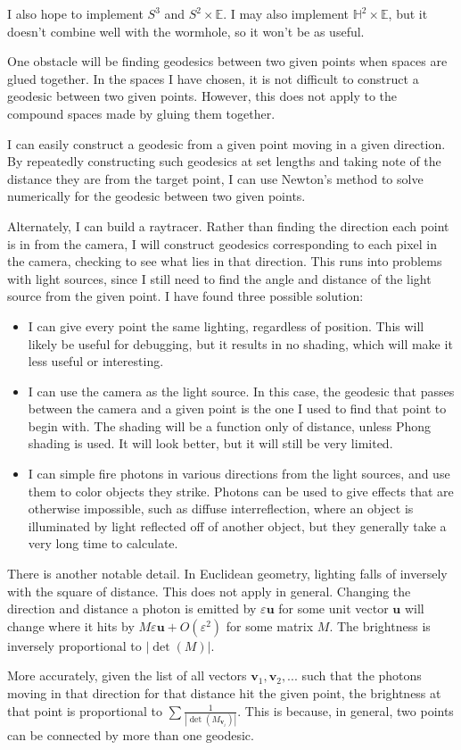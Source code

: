 \documentclass[12pt]{amsart}
\begin{document}
I also hope to implement $S^3$ and $S^2 \times \mathbb{E}$. I may also implement $\mathbb{H}^2 \times \mathbb{E}$, but it doesn't combine well with the wormhole, so it won't be as useful.


One obstacle will be finding geodesics between two given points when spaces are glued together. In the spaces I have chosen, it is not difficult to construct a geodesic between two given points. However, this does not apply to the compound spaces made by gluing them together.

I can easily construct a geodesic from a given point moving in a given direction. By repeatedly constructing such geodesics at set lengths and taking note of the distance they are from the target point, I can use Newton's method to solve numerically for the geodesic between two given points.

Alternately, I can build a raytracer. Rather than finding the direction each point is in from the camera, I will construct geodesics corresponding to each pixel in the camera, checking to see what lies in that direction. This runs into problems with light sources, since I still need to find the angle and distance of the light source from the given point. I have found three possible solution:

\begin{itemize}

\item I can give every point the same lighting, regardless of position. This will likely be useful for debugging, but it results in no shading, which will make it less useful or interesting.

\item I can use the camera as the light source. In this case, the geodesic that passes between the camera and a given point is the one I used to find that point to begin with. The shading will be a function only of distance, unless Phong shading is used. It will look better, but it will still be very limited.

\item I can simple fire photons in various directions from the light sources, and use them to color objects they strike. Photons can be used to give effects that are otherwise impossible, such as diffuse interreflection, where an object is illuminated by light reflected off of another object, but they generally take a very long time to calculate.

\end{itemize}

There is another notable detail. In Euclidean geometry, lighting falls of inversely with the square of distance. This does not apply in general. Changing the direction and distance a photon is emitted by $\varepsilon\textbf{u}$ for some unit vector $\textbf{u}$ will change where it hits by $M\varepsilon\textbf{u} + O(\varepsilon^2)$ for some matrix $M$. The brightness is inversely proportional to $|\det(M)|$.

More accurately, given the list of all vectors $\textbf{v}_1, \textbf{v}_2, ...$ such that the photons moving in that direction for that distance hit the given point, the brightness at that point is proportional to $\sum\frac{1}{|\det(M_{\textbf{v}_i})|}$. This is because, in general, two points can be connected by more than one geodesic.
\end{document}
